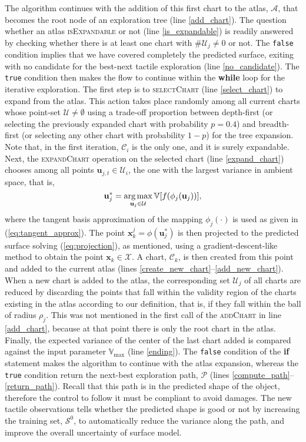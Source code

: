 The algorithm continues with the addition of this first chart to the atlas, $\mathcal{A}$, that becomes the root node of an exploration tree (line \ref{add_chart}). The question whether an atlas \textsc{isExpandable} or not (line \ref{is_expandable}) is readily answered by checking whether there is at least one chart with $\#\mathcal{U}_j \neq 0$ or not. The \texttt{false} condition implies that we have covered completely the predicted surface, exiting with no candidate for the best-next tactile exploration (line \ref{no_candidate}). The \texttt{true} condition then makes the flow to continue within the \textbf{while} loop for the iterative exploration. The first step is to \textsc{selectChart} (line \ref{select_chart}) to expand from the atlas. This action takes place randomly among all current charts whose point-set $\mathcal{U} \neq \emptyset$ using a trade-off proportion between depth-first (or selecting the previously expanded chart with probability $p = 0.4$) and breadth-first (or selecting any other chart with probability $1-p$) for the tree expansion. Note that, in the first iteration, $\mathcal{C}_i$ is the only one, and it is surely expandable. Next, the \textsc{expandChart} operation on the selected chart (line \ref{expand_chart}) chooses among all points $\mathbf{u}_{j,t} \in \mathcal{U}_i$, the one with the largest variance in ambient space, that is,
\begin{equation}
\mathbf{u}_{j}^* =  \operatorname*{arg\,max}_{\mathbf{u}_{j} \in \mathcal{U}} \mathbb{V}[f(\phi_j(\mathbf{u}_{j}))], 
\end{equation}
where the tangent basis approximation of the mapping $\phi_j(\cdot)$ is used as given in (\ref{eq:tangent_approx}). The point $\mathbf{x}_k^j = \phi(\mathbf{u}_{j}^*)$ is then projected to the predicted surface solving (\ref{eq:projection}), as mentioned, using a gradient-descent-like method to obtain the point $\mathbf{x}_k \in \mathcal{X}$. A chart, $\mathcal{C}_k$, is then created from this point and added to the current atlas (lines \ref{create_new_chart}--\ref{add_new_chart}). When a new chart is added to the atlas, the corresponding set $\mathcal{U}_j$ of all charts are reduced by discarding the points that fall within the validity region of the charts existing in the atlas according to our definition, that is, if they fall within the ball of radius $\rho_j$. This was not mentioned in the first call of the \textsc{addChart} in line \ref{add_chart}, because at that point there is only the root chart in the atlas. Finally, the expected variance of the center of the last chart added is compared against the input parameter $\mathbb{V}_{\max}$ (line \ref{ending}). The \texttt{false} condition of the \textbf{if} statement makes the algorithm to continue with the atlas expansion, whereas the \texttt{true} condition return the next-best exploration path, $\mathcal{P}$ (lines \ref{compute_path}--\ref{return_path}). Recall that this path is in the predicted shape of the object, therefore the control to follow it must be compliant to avoid damages. The new tactile observations tells whether the predicted shape is good or not by increasing the training set, $\mathcal{S}^0$, to automatically reduce the variance along the path, and improve the overall uncertainty of surface model.
